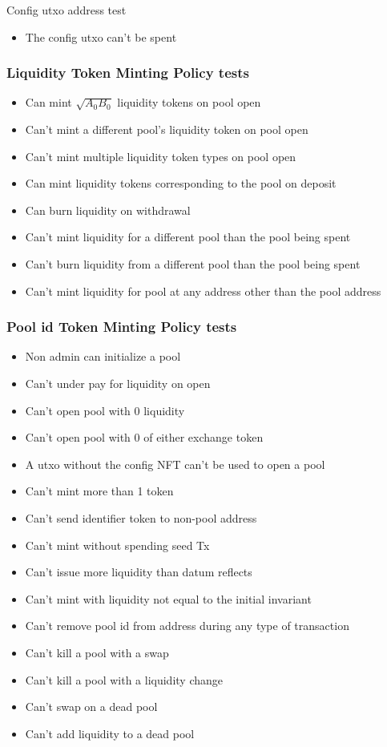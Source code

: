 \documentclass{article}
\begin{document}
Config utxo address test

\begin{itemize}
	\item The config utxo can't be spent
\end{itemize}

\subsubsection{Liquidity Token Minting Policy tests}

\begin{itemize}
	\item Can mint $\sqrt{A_0B_0}$ liquidity tokens on pool open
	\item Can't mint a different pool's liquidity token on pool open
	\item Can't mint multiple liquidity token types on pool open
	\item Can mint liquidity tokens corresponding to the pool on deposit
	\item Can burn liquidity on withdrawal
	\item Can't mint liquidity for a different pool than the pool being spent
	\item Can't burn liquidity from a different pool than the pool being spent
	\item Can't mint liquidity for pool at any address other than the pool address
\end{itemize}

\subsubsection{Pool id Token Minting Policy tests}

\begin{itemize}
	\item Non admin can initialize a pool
	\item Can't under pay for liquidity on open
	\item Can't open pool with 0 liquidity
	\item Can't open pool with 0 of either exchange token
	\item A utxo without the config NFT can't be used to open a pool
	\item Can't mint more than 1 token
	\item Can't send identifier token to non-pool address
	\item Can't mint without spending seed Tx
	\item Can't issue more liquidity than datum reflects
	\item Can't mint with liquidity not equal to the initial invariant
	\item Can't remove pool id from address during any type of transaction
	\item Can't kill a pool with a swap
	\item Can't kill a pool with a liquidity change
	\item Can't swap on a dead pool
	\item Can't add liquidity to a dead pool
\end{itemize}
\end{document}
